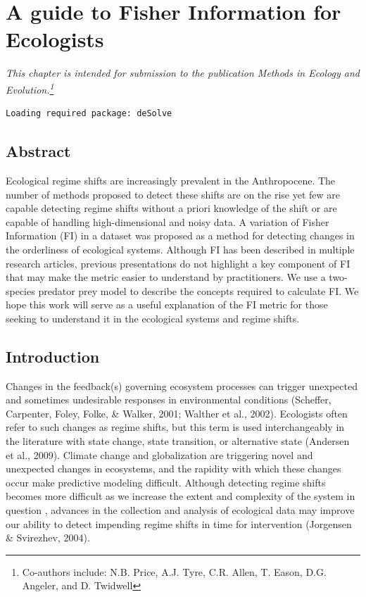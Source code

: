 \documentclass[12pt,twoside,openany]{reedthesis}
\begin{document}
\chapter{A guide to Fisher Information for Ecologists}\label{fiGuide}

\emph{This chapter is intended for submission to the publication
\emph{Methods in Ecology and Evolution}.\footnote{Co-authors include:
  N.B. Price, A.J. Tyre, C.R. Allen, T. Eason, D.G. Angeler, and D.
  Twidwell}}
\begin{verbatim}
Loading required package: deSolve
\end{verbatim}
\section{Abstract}\label{abstract-1}

Ecological regime shifts are increasingly prevalent in the Anthropocene.
The number of methods proposed to detect these shifts are on the rise
yet few are capable detecting regime shifts without a priori knowledge
of the shift or are capable of handling high-dimensional and noisy data.
A variation of Fisher Information (FI) in a dataset was proposed as a
method for detecting changes in the orderliness of ecological systems.
Although FI has been described in multiple research articles, previous
presentations do not highlight a key component of FI that may make the
metric easier to understand by practitioners. We use a two-species
predator prey model to describe the concepts required to calculate FI.
We hope this work will serve as a useful explanation of the FI metric
for those seeking to understand it in the ecological systems and regime
shifts.

\section{Introduction}\label{introduction-1}

Changes in the feedback(s) governing ecosystem processes can trigger
unexpected and sometimes undesirable responses in environmental
conditions (Scheffer, Carpenter, Foley, Folke, \& Walker, 2001; Walther
et al., 2002). Ecologists often refer to such changes as regime shifts,
but this term is used interchangeably in the literature with state
change, state transition, or alternative state (Andersen et al., 2009).
Climate change and globalization are triggering novel and unexpected
changes in ecosystems, and the rapidity with which these changes occur
make predictive modeling difficult. Although detecting regime shifts
becomes more difficult as we increase the extent and complexity of the
system in question , advances in the collection and analysis of
ecological data may improve our ability to detect impending regime
shifts in time for intervention (Jorgensen \& Svirezhev, 2004).
\end{document}

